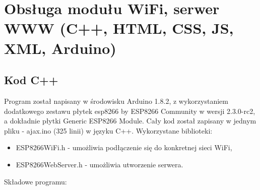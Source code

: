 \documentclass[a4paper,12pt,twoside,openany]{report}
\begin{document}
\section{Obsługa modułu WiFi, serwer WWW (C++, HTML, CSS, JS, XML, Arduino)}

\subsection{Kod C++}

Program został napisany w środowisku Arduino 1.8.2, z wykorzystaniem dodatkowego zestawu płytek esp8266 by ESP8266 Community w wersji 2.3.0-rc2, a dokładnie płytki Generic ESP8266 Module. Cały kod został zapisany w jednym pliku - ajax.ino (325 linii) w języku C++. Wykorzystane biblioteki:
\begin{itemize}
\item ESP8266WiFi.h - umożliwia podłączenie się do konkretnej sieci WiFi,
\item ESP8266WebServer.h - umożliwia utworzenie serwera.
\end{itemize}
Składowe programu:
\end{document}
